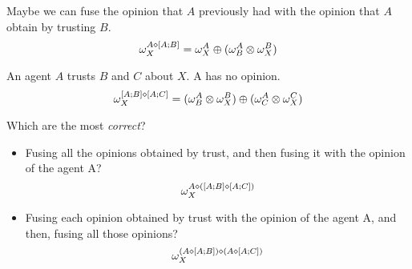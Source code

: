 \documentclass[a4paper,12pt]{article}
\theoremstyle{definition}
\theoremstyle{theorem}
\numberwithin{equation}{section}
\begin{document}
Maybe we can fuse the opinion that $A$ previously had with the opinion that $A$ obtain by trusting $B$.
\begin{equation}
\omega^{A \diamond [A;B]}_{X} = \omega^{A}_{X} \oplus (\omega^{A}_{B} \otimes \omega^{B}_{X})
\end{equation}

An agent $A$ trusts $B$ and $C$ about $X$. A has no opinion.
\begin{equation}
\omega^{[A; B] \diamond [A; C]}_{X} = (\omega^{A}_{B} \otimes \omega^{B}_{X}) \oplus (\omega^{A}_{C} \otimes \omega^{C}_{X})
\end{equation}

Which are the most \emph{correct}?
\begin{itemize}
\item Fusing all the opinions obtained by trust, and then fusing it with the opinion of the agent A?
\begin{equation}
\omega^{A \diamond ([A; B] \diamond [A; C])}_{X}
\end{equation}

\item Fusing each opinion obtained by trust with the opinion of the agent A, and then, fusing all those opinions?
\begin{equation}
\omega^{(A \diamond [A; B]) \diamond (A \diamond [A; C])}_{X}
\end{equation}
\end{itemize}





\printbibliography
\end{document}
